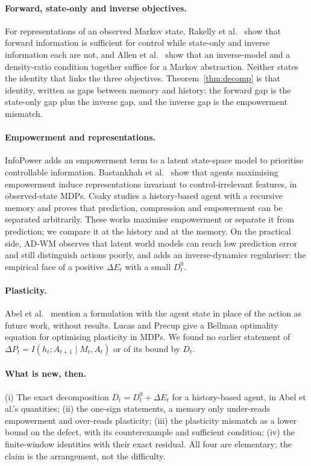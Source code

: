 \documentclass[11pt]{article}
\theoremstyle{plain}
\theoremstyle{definition}
\theoremstyle{remark}
\newcommand{\dE}{\Delta E}
\newcommand{\dP}{\Delta P}
\begin{document}
\paragraph{Forward, state-only and inverse objectives.} For representations of an observed Markov state, Rakelly et al.\ \cite{rakelly2021which} show that forward information is sufficient for control while state-only and inverse information each are not, and Allen et al.\ \cite{allen2021learning} show that an inverse-model and a density-ratio condition together suffice for a Markov abstraction. Neither states the identity that links the three objectives. Theorem~\ref{thm:decomp} is that identity, written as gaps between memory and history: the forward gap is the state-only gap plus the inverse gap, and the inverse gap is the empowerment mismatch.

\paragraph{Empowerment and representations.} InfoPower \cite{bharadhwaj2022information} adds an empowerment term to a latent state-space model to prioritise controllable information. Bastankhah et al.\ \cite{bastankhah2026learning} show that agents maximising empowerment induce representations invariant to control-irrelevant features, in observed-state MDPs. Csaky \cite{csaky2026prediction} studies a history-based agent with a recursive memory and proves that prediction, compression and empowerment can be separated arbitrarily. These works maximise empowerment or separate it from prediction; we compare it at the history and at the memory. On the practical side, AD-WM \cite{qiu2026adwm} observes that latent world models can reach low prediction error and still distinguish actions poorly, and adds an inverse-dynamics regulariser: the empirical face of a positive $\dE_t$ with a small $D^0_t$.

\paragraph{Plasticity.} Abel et al.\ \cite{abel2025plasticity} mention a formulation with the agent state in place of the action as future work, without results. Lucas and Precup \cite{lucas2026bellman} give a Bellman optimality equation for optimising plasticity in MDPs. We found no earlier statement of $\dP_t = I(h_t; A_{t+1} \mid M_t, A_t)$ or of its bound by $D_t$.

\paragraph{What is new, then.} (i) The exact decomposition $D_t = D^0_t + \dE_t$ for a history-based agent, in Abel et al.'s quantities; (ii) the one-sign statements, a memory only under-reads empowerment and over-reads plasticity; (iii) the plasticity mismatch as a lower bound on the defect, with its counterexample and sufficient condition; (iv) the finite-window identities with their exact residual. All four are elementary; the claim is the arrangement, not the difficulty.
\end{document}
